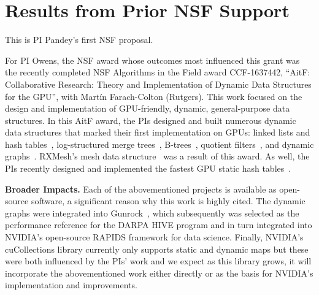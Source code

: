 \section{Results from Prior NSF Support}

This is PI Pandey's first NSF proposal.


For PI Owens, the NSF award whose outcomes most influenced this grant was the recently completed NSF Algorithms in the Field award CCF-1637442, ``AitF: Collaborative Research: Theory and Implementation of Dynamic Data Structures for the GPU'', with Mart\'{i}n Farach-Colton (Rutgers). This work focused on the design and implementation of GPU-friendly, dynamic, general-purpose data structures.
 In this AitF award, the PIs designed and built numerous dynamic data structures that marked their first implementation on GPUs: linked lists and hash tables~\cite{Ashkiani:2018:ADH}, log-structured merge trees~\cite{Ashkiani:2018:GLA}, B-trees~\cite{Awad:2019:EAH}, quotient filters~\cite{Geil:2018:QFA}, and dynamic graphs~\cite{Awad:2020:DGO}. RXMesh's mesh data structure~\cite{Mahmoud:2021:RAG} was a result of this award. As well, the PIs recently designed and implemented the fastest GPU static hash tables~\cite{Awad:2023:AAI}.

\textbf{Broader Impacts.} Each of the abovementioned projects is available as open-source software, a significant reason why this work is highly cited. The dynamic graphs were integrated into Gunrock~\cite{Awad:2020:DGO,Wang:2017:GGG}, which subsequently was selected as the performance reference for the DARPA HIVE program and in turn integrated into NVIDIA's open-source RAPIDS framework for data science. Finally, NVIDIA's cuCollections library currently only supports static and dynamic maps but these were both influenced by the PIs' work and we expect as this library grows, it will incorporate the abovementioned work either directly or as the basis for NVIDIA's implementation and improvements.

